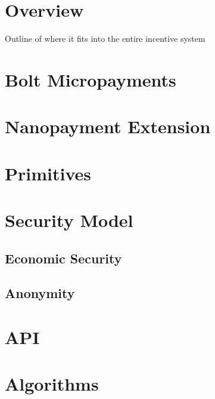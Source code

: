 \documentclass{article}
\begin{document}
\section{Overview}
Outline of where it fits into the entire incentive system
\section{Bolt Micropayments}

\section{Nanopayment Extension}

\section{Primitives}

\section{Security Model}

\subsection{Economic Security}

\subsection{Anonymity}

\section{API}

\section{Algorithms}
\end{document}
